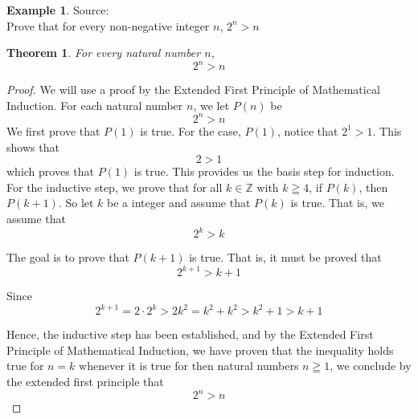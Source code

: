 \documentclass{book}
\newtheorem{theorem}{Theorem}[section]
\theoremstyle{definition}
\newtheorem{example}{Example}[definition]
\theoremstyle{remark}
\newcommand{\bb}[1]{\mathbb{#1}}
\newcommand{\m}{\cdot}
\begin{document}
\newpage
\begin{example}
Source: \cite[Chap.6, S.6.2, Result 6.9]{gray} \\ 

Prove that for every non-negative integer $n$, $2^n > n$ 
\begin{tcolorbox}
    \begin{theorem}
        For every natural number $n$,
        \begin{equation*}
            2^n > n              
        \end{equation*}
    \end{theorem}
\end{tcolorbox}

\begin{proof}
    We will use a proof by the Extended First Principle of Mathematical Induction. For each natural number $n$, we let $P(n)$ be
        \begin{equation*}
            2^n > n
        \end{equation*}
    We first prove that $P(1)$ is true. For the case, $P(1)$, notice that $2^1 > 1$. This shows that   
        \begin{equation*}
             2 > 1
        \end{equation*}
    which proves that $P(1)$ is true. This provides us the basis step for induction. \\ 
    
    For the inductive step, we prove that for all $k \in \bb{Z}$ with $k \geqq 4$, if $P(k)$, then $P(k+1)$. So let $k$ be a integer and assume that $P(k)$ is true. That is, we assume that 
        \begin{equation*}
           2^k > k
        \end{equation*}
    
    The goal is to prove that $P(k+1)$ is true. That is, it must be proved that  
        \begin{equation}
            2^{k+1} > k+1 
        \end{equation}
    
    Since
        \begin{equation}
            2^{k+1} = 2 \m 2^k > 2k^2 = k^2 + k^2 > k^2 + 1 > k + 1 
        \end{equation}
    
    Hence, the inductive step has been established, and by the Extended First Principle of Mathematical Induction, we have proven that the inequality holds true for $n=k$ whenever it is true for then natural numbers $n \geqq 1$, we conclude by the extended first principle that
        \begin{equation*}
            2^n > n
        \end{equation*}
 
\end{proof}
\end{example}
\end{document}
